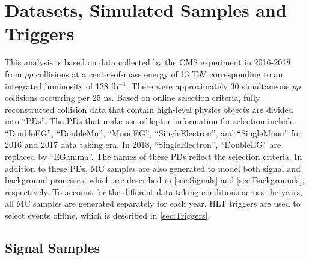 \chapter{Datasets, Simulated Samples and Triggers}
\label{chap:Samples}

This analysis is based on data collected by the \ac{CMS} experiment in 2016-2018 from $pp$ collisions at a center-of-mass energy of 13 TeV corresponding to an integrated luminosity of 138 fb$^{-1}$. There were approximately 30 simultaneous $pp$ collisions occurring per 25 ns. Based on online selection criteria, fully reconstructed collision data that contain high-level physics objects are divided into ``\acp{PD}''. The \acp{PD} that make use of lepton information for selection include ``DoubleEG'', ``DoubleMu'', ``MuonEG'', ``SingleElectron'', and ``SingleMuon'' for 2016 and 2017 data taking era. In 2018, ``SingleElectron'', ``DoubleEG'' are replaced by ``EGamma''. The names of these \acp{PD} reflect the selection criteria. In addition to these \acp{PD}, \ac{MC} samples are also generated to model both signal and background processes, which are described in \autoref{sec:Signals} and \autoref{sec:Backgrounds}, respectively. To account for the different data taking conditions across the years, all \ac{MC} samples are generated separately for each year. \ac{HLT} triggers are used to select events offline, which is described in \autoref{sec:Triggers}.
\section{Signal Samples}
\label{sec:Signals}

